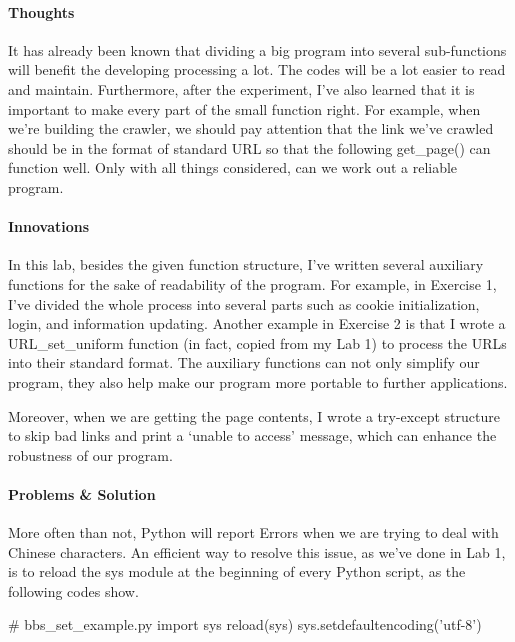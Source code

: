 \documentclass{article}
\begin{document}
\paragraph{Thoughts}
It has already been known that dividing a big program into several sub-functions will benefit the developing processing a lot. The codes will be a lot easier to read and maintain. Furthermore, after the experiment, I've also learned that it is important to make every part of the small function right. For example, when we're building the crawler, we should pay attention that the link we've crawled should be in the format of standard URL so that the following get\_page() can function well. Only with all things considered, can we work out a reliable program.

\paragraph{Innovations}
In this lab, besides the given function structure, I've written several auxiliary functions for the sake of readability of the program. For example, in Exercise 1, I've divided the whole process into several parts such as cookie initialization, login, and information updating. Another example in Exercise 2 is that I wrote a URL\_set\_uniform function (in fact, copied from my Lab 1) to process the URLs into their standard format. The auxiliary functions can not only simplify our program, they also help make our program more portable to further applications.

Moreover, when we are getting the page contents, I wrote a try-except structure to skip bad links and print a `unable to access' message, which can enhance the robustness of our program.


\paragraph{Problems \& Solution}
More often than not, Python will report Errors when we are trying to deal with Chinese characters. An efficient way to resolve this issue, as we've done in Lab 1, is to reload the sys module at the beginning of every Python script, as the following codes show. 

\begin{python}
# bbs_set_example.py
import sys
reload(sys)
sys.setdefaultencoding('utf-8')
\end{python}
\end{document}
